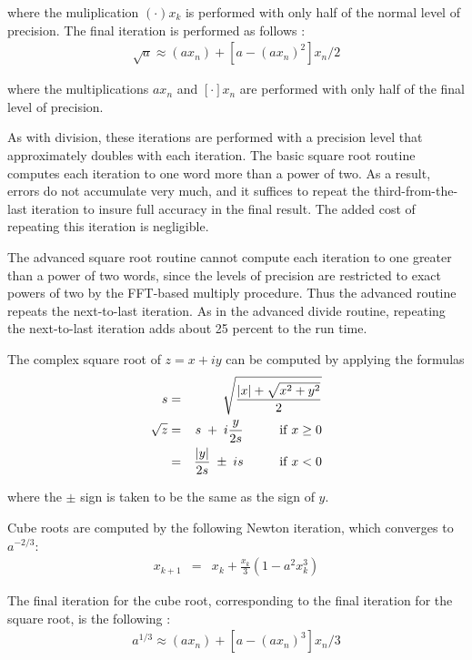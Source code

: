 \noindent
where the muliplication $(\cdot) x_k$ is performed with only half of the
normal level of precision.  The final iteration is performed as
follows \cite{karp}:
\begin{eqnarray*}
\sqrt{a} \approx (a x_n) + [a - (a x_n)^2] x_n / 2
\end{eqnarray*}

\noindent
where the multiplications $a x_n$ and $[\cdot] x_n$ are performed with
only half of the final level of precision.

As with division, these iterations are performed with a precision
level that approximately doubles with each iteration.  The basic
square root routine computes each iteration to one word more than a
power of two.  As a result, errors do not accumulate very much, and it
suffices to repeat the third-from-the-last iteration to insure full
accuracy in the final result.  The added cost of repeating this
iteration is negligible.

The advanced square root routine cannot compute each iteration to one
greater than a power of two words, since the levels of precision are
restricted to exact powers of two by the FFT-based multiply procedure.
Thus the advanced routine repeats the next-to-last iteration.  As in
the advanced divide routine, repeating the next-to-last iteration adds
about 25 percent to the run time.

The complex square root of $z = x + i y$ can be computed by applying
the formulas
\begin{eqnarray*}
s        &=& \sqrt{\frac{|x| + \sqrt{x^2 + y^2}}{2}} \\
\sqrt{z} &=& s \; + \; i \frac{y}{2 s} \hspace{1cm} {\rm if} \; x \geq 0 \\
         &=& \frac{|y|}{2 s} \; \pm \; i s \hspace{1cm} {\rm if} \; x < 0
\end{eqnarray*}

\noindent
where the $\pm$ sign is taken to be the same as the sign of $y$.

Cube roots are computed by the following Newton iteration, which
converges to $a^{-2/3}$:
\begin{eqnarray*}
x_{k+1} &=& x_k + \frac{x_k}{3} (1 - a^2 x_k^3)
\end{eqnarray*}

\noindent
The final iteration for the cube root, corresponding to the final
iteration for the square root, is the following \cite{karp}:
\begin{eqnarray*}
a^{1/3} \approx (a x_n) + [a - (a x_n)^3] x_n / 3
\end{eqnarray*}

